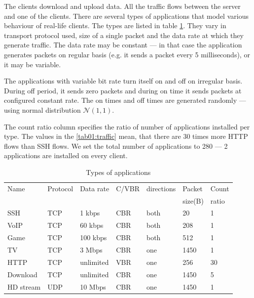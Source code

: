 The clients download and upload data. All the traffic flows between the server and one of the clients. There are several types of applications that model various behaviour of real-life clients. The types are listed in table \ref{tab01:traffic}. They vary in transport protocol used, size of a single packet and the data rate at which they generate traffic. The data rate may be constant --- in that case the application generates packets on regular basis (e.g. it sends a packet every 5 milliseconds), or it may be variable.

The applications with variable bit rate turn itself on and off on irregular basis. During off period, it sends zero packets and during on time it sends packets at configured constant rate. The on times and off times are generated randomly --- using normal distribution $\mathcal{N}(1,1)$.

The count ratio column specifies the ratio of number of applications installed per type. The values in the \autoref{tab01:traffic} mean, that there are 30 times more HTTP flows than SSH flows. We set the total number of applications to 280 --- 2 applications are installed on every client. 

\begin{table}
	\caption{Types of applications}
	\label{tab01:traffic}
	\centering
	
	
	\begin{tabular}{@{}lllllll@{}}
		\toprule
		Name     & Protocol & Data rate & C/VBR   & directions & Packet         & Count    \\ 
	    	     &          &           &         &            & size(B)        & ratio    \\ \midrule
		SSH      & TCP      & 1 kbps    & CBR     & both       & 20             & 1        \\
		VoIP     & TCP      & 60 kbps   & CBR     & both       & 208            & 1        \\
		Game     & TCP      & 100 kbps  & CBR     & both       & 512            & 1        \\
		TV       & TCP      & 3 Mbps    & CBR     & one        & 1450           & 1        \\
		HTTP     & TCP      & unlimited & VBR     & one        & 256            & 30       \\
		Download & TCP      & unlimited & CBR     & one        & 1450           & 5        \\
		HD stream& UDP      & 10 Mbps   & CBR     & one        & 1450           & 1        \\ \bottomrule
	\end{tabular}
\end{table}



